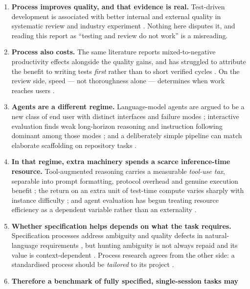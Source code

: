 \documentclass[11pt,a4paper]{article}
\begin{document}
\begin{enumerate}[label=\textbf{\Alph*.},leftmargin=2.1em]
\item \textbf{Process improves quality, and that evidence is real.} Test-driven development is
      associated with better internal and external quality in systematic review
      \citep{bissi2016tdd} and industry experiment \citep{tosun2017industry}. Nothing here
      disputes it, and reading this report as ``testing and review do not work'' is a
      misreading.
\item \textbf{Process also costs.} The same literature reports mixed-to-negative productivity
      effects alongside the quality gains, and has struggled to attribute the benefit to
      writing tests \emph{first} rather than to short verified cycles
      \citep{fucci2017dissection}. On the review side, speed --- not thoroughness alone ---
      determines when work reaches users \citep{kudrjavets2024review}.
\item \textbf{Agents are a different regime.} Language-model agents are argued to be a new
      class of end user with distinct interfaces and failure modes
      \citep{yang2024sweagent}; interactive evaluation finds weak long-horizon reasoning and
      instruction following dominant among those modes \citep{liu2024agentbench}; and a
      deliberately simple pipeline can match elaborate scaffolding on repository tasks
      \citep{xia2024agentless}.
\item \textbf{In that regime, extra machinery spends a scarce inference-time resource.}
      Tool-augmented reasoning carries a measurable \emph{tool-use tax}, separable into prompt
      formatting, protocol overhead and genuine execution benefit \citep{zhang2026tooltax};
      the return on an extra unit of test-time compute varies sharply with instance difficulty
      \citep{snell2024scaling}; and agent evaluation has begun treating resource efficiency as
      a dependent variable rather than an externality \citep{liu2026costbench}.
\item \textbf{Whether specification helps depends on what the task requires.} Specification
      processes address ambiguity and quality defects in natural-language requirements
      \citep{femmer2017smells}, but hunting ambiguity is not always repaid and its value is
      context-dependent \citep{ribeiro2020ambiguity}. Process research agrees from the other
      side: a standardised process should be \emph{tailored} to its project
      \citep{xu2007tailoring}.
\item \textbf{Therefore a benchmark of fully specified, single-session tasks may
}
\end{enumerate}
\end{document}
